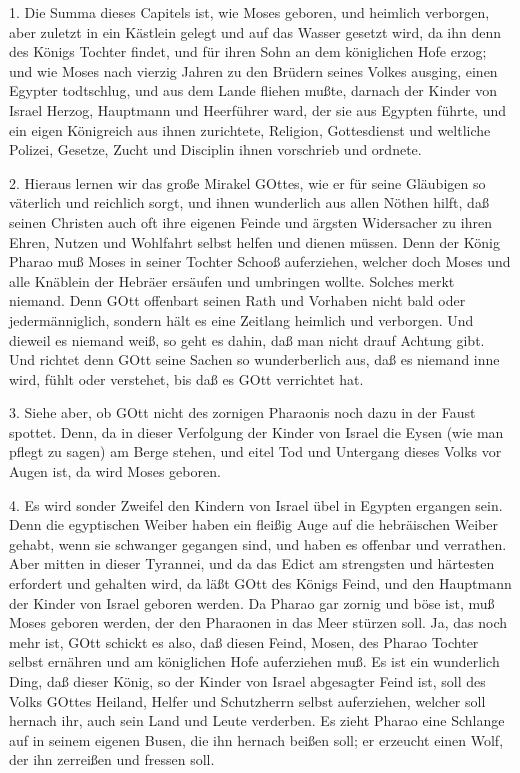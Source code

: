 1. Die Summa dieses Capitels ist, wie Moses geboren, und heimlich verborgen, aber zuletzt in ein Kästlein gelegt und auf das Wasser gesetzt wird, da ihn denn des Königs Tochter findet, und für ihren Sohn an dem königlichen Hofe erzog; und wie Moses nach vierzig Jahren zu den Brüdern seines Volkes ausging, einen Egypter todtschlug, und aus dem Lande fliehen mußte, darnach der Kinder von Israel Herzog, Hauptmann und Heerführer ward, der sie aus Egypten führte, und ein eigen Königreich aus ihnen zurichtete, Religion, Gottesdienst und weltliche Polizei, Gesetze, Zucht und Disciplin ihnen vorschrieb und ordnete.

2. Hieraus lernen wir das große Mirakel GOttes, wie er für seine Gläubigen so väterlich und reichlich sorgt, und ihnen wunderlich aus allen Nöthen hilft, daß seinen Christen auch oft ihre eigenen Feinde und ärgsten Widersacher zu ihren Ehren, Nutzen und Wohlfahrt selbst helfen und dienen müssen. Denn der König Pharao muß Moses in seiner Tochter Schooß auferziehen, welcher doch Moses und alle Knäblein der Hebräer ersäufen und umbringen wollte. Solches merkt niemand. Denn GOtt offenbart seinen Rath und Vorhaben nicht bald oder jedermänniglich, sondern hält es eine Zeitlang heimlich und verborgen. Und dieweil es niemand weiß, so geht es dahin, daß man nicht drauf Achtung gibt. Und richtet denn GOtt seine Sachen so wunderberlich aus, daß es niemand inne wird, fühlt oder verstehet, bis daß es GOtt verrichtet hat.

3. Siehe aber, ob GOtt nicht des zornigen Pharaonis noch dazu in der Faust spottet. Denn, da in dieser Verfolgung der Kinder von Israel die Eysen (wie man pflegt zu sagen) am Berge stehen, und eitel Tod und Untergang dieses Volks vor Augen ist, da wird Moses geboren.

4. Es wird sonder Zweifel den Kindern von
Israel übel in Egypten ergangen sein. Denn die egyptischen Weiber haben ein fleißig Auge auf die hebräischen Weiber gehabt, wenn sie schwanger gegangen sind, und haben es offenbar und verrathen. Aber mitten in dieser Tyrannei, und da das Edict am strengsten und härtesten erfordert und gehalten wird, da läßt GOtt des Königs Feind, und den Hauptmann der Kinder von Israel geboren werden. Da Pharao gar zornig und böse ist, muß Moses geboren werden, der den Pharaonen in das Meer stürzen soll. Ja, das noch mehr ist, GOtt schickt es also, daß diesen Feind, Mosen, des Pharao Tochter selbst ernähren und am königlichen Hofe auferziehen muß. Es ist ein wunderlich Ding, daß dieser König, so der Kinder von Israel abgesagter Feind ist, soll des Volks GOttes Heiland, Helfer und Schutzherrn selbst auferziehen, welcher soll hernach ihr, auch sein Land und Leute verderben. Es zieht Pharao eine Schlange auf in seinem eigenen Busen, die ihn hernach beißen soll; er erzeucht einen Wolf, der ihn zerreißen und fressen soll.

